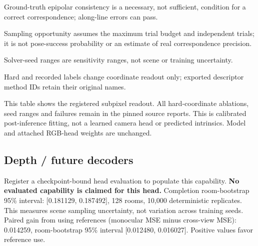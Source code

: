 \documentclass[10pt]{article}
\begin{document}
Ground-truth epipolar consistency is a necessary, not sufficient, condition for a correct correspondence; along-line errors can pass.

Sampling opportunity assumes the maximum trial budget and independent trials; it is not pose-success probability or an estimate of real correspondence precision.

Solver-seed ranges are sensitivity ranges, not scene or training uncertainty.

Hard and recorded labels change coordinate readout only; exported descriptor method IDs retain their original names.

This table shows the registered subpixel readout. All hard-coordinate ablations, seed ranges and failures remain in the pinned source reports. This is calibrated post-inference fitting, not a learned camera head or predicted intrinsics. Model and attached RGB-head weights are unchanged.

\subsection{Depth / future decoders}
Register a checkpoint-bound head evaluation to populate this capability.
\textbf{No evaluated capability is claimed for this head.}
Completion room-bootstrap 95\% interval: [0.181129, 0.187492], 128 rooms, 10,000 deterministic replicates. This measures scene sampling uncertainty, not variation across training seeds.
Paired gain from using references (monocular MSE minus cross-view MSE): 0.014259, room-bootstrap 95\% interval [0.012480, 0.016027]. Positive values favor reference use.
\end{document}
